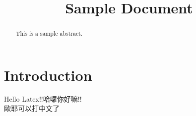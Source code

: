\documentclass[12pt]{article}
\begin{document}
\title{Sample Document}
\author{
}

\maketitle

\begin{abstract}
This is a sample abstract.
\end{abstract}

\section{Introduction}
Hello Latex!!哈囉你好嘛!!\\
歐耶可以打中文了
\end{document}
